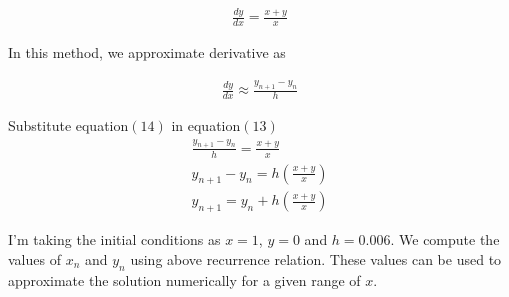 \documentclass[journal,12pt,onecolumn]{IEEEtran}
\theoremstyle{remark}
\begin{document}
\begin{align}
\frac{dy}{dx} = \frac{x+y}{x}
\end{align}

In this method, we approximate derivative as

\begin{align}
\frac{dy}{dx} \approx \frac{y_{n+1} - y_n}{h}
\end{align}

Substitute equation$(14)$ in equation$(13)$
\begin{align}
	\frac{y_{n+1} - y_n}{h} =  \frac{x+y}{x}\\
	y_{n+1}-y_n = h  (\frac{x+y}{x})\\
	y_{n+1} = y_n + h(\frac{x+y}{x})
\end{align}

I'm taking the initial conditions as $x=1$, $y=0$ and $h=0.006$. We compute the values of $x_n$ and $y_n$ using above recurrence relation. These values can be used to approximate the solution numerically for a given range of $x$.
\end{document}

